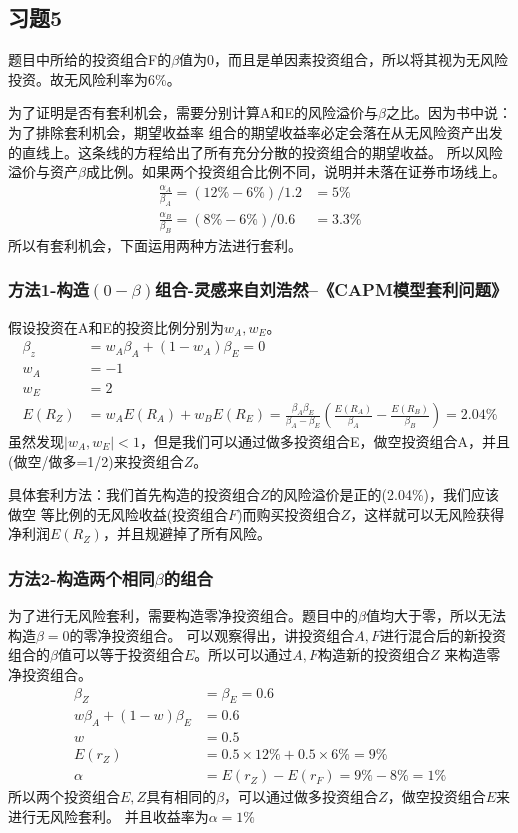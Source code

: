 \documentclass{article}
\begin{document}
\subsection*{习题5}
题目中所给的投资组合F的$\beta$值为0，而且是单因素投资组合，所以将其视为无风险投资。故无风险利率为6\%。

为了证明是否有套利机会，需要分别计算A和E的风险溢价与$\beta$之比。因为书中说：为了排除套利机会，期望收益率
组合的期望收益率必定会落在从无风险资产出发的直线上。这条线的方程给出了所有充分分散的投资组合的期望收益。
所以风险溢价与资产$\beta$成比例。如果两个投资组合比例不同，说明并未落在证券市场线上。
\begin{align}
    \frac{\alpha_A}{\beta_A}=(12\%-6\%)/1.2&=5\%\\
    \frac{\alpha_B}{\beta_B}=(8\%-6\%)/0.6&=3.3\%
\end{align}
所以有套利机会，下面运用两种方法进行套利。
\subsubsection*{方法1-构造$(0-\beta)$组合-灵感来自刘浩然--《CAPM模型套利问题》}
假设投资在A和E的投资比例分别为$w_A,w_E$。
\begin{align}
    \beta_z&=w_A\beta_A+(1-w_A)\beta_E=0\\
    w_A&=-1\\
    w_E&=2\\
    E(R_Z)&=w_AE(R_A)+w_BE(R_E)=\frac{\beta_A\beta_E}{\beta_A-\beta_E}(\frac{E(R_A)}{\beta_A}-\frac{E(R_B)}{\beta_B})=2.04\%
\end{align}
虽然发现$|w_A,w_E|<1$，但是我们可以通过做多投资组合E，做空投资组合A，并且(做空/做多=1/2)来投资组合$Z$。

具体套利方法：我们首先构造的投资组合$Z$的风险溢价是正的(2.04\%)，我们应该做空
等比例的无风险收益(投资组合$F$)而购买投资组合$Z$，这样就可以无风险获得净利润$E(R_Z)$，并且规避掉了所有风险。


\subsubsection*{方法2-构造两个相同$\beta$的组合}
为了进行无风险套利，需要构造零净投资组合。题目中的$\beta$值均大于零，所以无法构造$\beta=0$的零净投资组合。
可以观察得出，讲投资组合$A,F$进行混合后的新投资组合的$\beta$值可以等于投资组合$E$。所以可以通过$A,F$构造新的投资组合$Z$
来构造零净投资组合。
\begin{align}
    \beta_Z&=\beta_E=0.6\\
    w\beta_A+(1-w)\beta_E&=0.6\\
    w&=0.5\\
    E(r_Z)&=0.5\times 12\%+0.5\times 6\%=9\%\\
    \alpha&=E(r_Z)-E(r_F)=9\%-8\%=1\%
\end{align}
所以两个投资组合$E,Z$具有相同的$\beta$，可以通过做多投资组合$Z$，做空投资组合$E$来进行无风险套利。
并且收益率为$\alpha =1\%$
\end{document}

